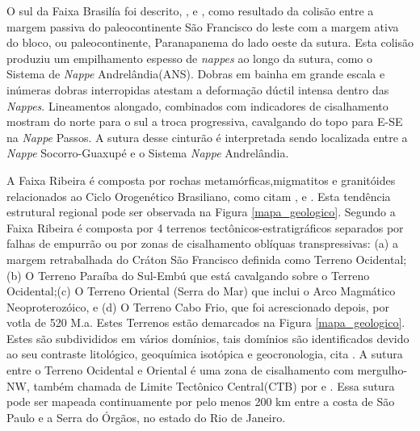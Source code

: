 O sul da Faixa Brasilía foi descrito, \cite{pimentel_tectonic_2011},\cite{reno_situ_2012} e \cite{trouw_new_2013}, como resultado da colisão entre a margem passiva do paleocontinente São Francisco do leste com a margem ativa do bloco, ou paleocontinente, Paranapanema do lado oeste da sutura. Esta colisão produziu um empilhamento espesso de \textit{nappes} ao longo da sutura, como o Sistema de \textit{Nappe} Andrelândia(ANS). Dobras em bainha em grande escala e inúmeras dobras interropidas atestam a deformação dúctil intensa dentro das \textit{Nappes}. Lineamentos alongado, combinados com indicadores de cisalhamento mostram do norte para o sul a troca progressiva, cavalgando do topo para E-SE  na \textit{Nappe} Passos. A sutura desse cinturão é interpretada sendo localizada entre a \textit{Nappe} Socorro-Guaxupé e o Sistema \textit{Nappe} Andrelândia.

A Faixa Ribeira é composta por rochas metamórficas,migmatitos e granitóides relacionados ao Ciclo Orogenético Brasiliano, como citam \cite{kuhn_metamorphic_2004}, \cite{heilbron_evolution_2010} e \cite{valeriano_u_pb_2011}. Esta tendência estrutural regional pode ser observada na Figura \ref{mapa_geologico}. Segundo \cite{heilbron_evolution_2010} a Faixa Ribeira é composta por 4 terrenos tectônicos-estratigráficos separados por falhas de
empurrão ou por zonas de cisalhamento oblíquas transpressivas: (a) a margem retrabalhada do Cráton São Francisco definida como Terreno Ocidental; (b) O Terreno Paraíba do Sul-Embú que está cavalgando sobre o Terreno Ocidental;(c) O Terreno Oriental (Serra do Mar) que inclui o Arco Magmático Neoproterozóico, e (d) O Terreno Cabo Frio, que foi acrescionado depois, por votla de 520 M.a. Estes Terrenos estão demarcados na Figura \ref{mapa_geologico}. Estes são subdivididos em vários domínios, tais domínios são identificados devido ao seu contraste litológico, geoquímica isotópica e geocronologia, cita \cite{kuhn_metamorphic_2004}. A sutura entre o Terreno Ocidental e Oriental é uma zona de cisalhamento com mergulho-NW, também chamada de Limite Tectônico Central(CTB) por \cite{heilbron_evolution_2010} e \cite{trouw_new_2013}. Essa sutura pode ser mapeada continuamente por pelo menos 200 km entre a costa de São Paulo e a Serra do Órgãos, no estado do Rio de Janeiro. 

